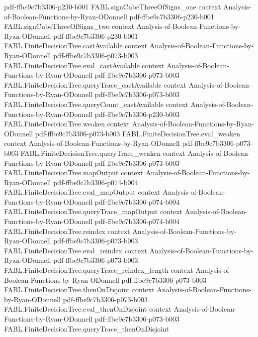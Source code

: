 \begin{theorem}
  {pdf-ffbe9c7b3306-p230-b001}
\proofstep
  {FABL.signCubeThreeOfSigns_one}
  {context}
  {Analysis-of-Boolean-Functions-by-Ryan-ODonnell}
  {pdf-ffbe9c7b3306-p230-b001}
\proofstep
  {FABL.signCubeThreeOfSigns_two}
  {context}
  {Analysis-of-Boolean-Functions-by-Ryan-ODonnell}
  {pdf-ffbe9c7b3306-p230-b001}
\proofstep
  {FABL.FiniteDecisionTree.castAvailable}
  {context}
  {Analysis-of-Boolean-Functions-by-Ryan-ODonnell}
  {pdf-ffbe9c7b3306-p073-b003}
\proofstep
  {FABL.FiniteDecisionTree.eval_castAvailable}
  {context}
  {Analysis-of-Boolean-Functions-by-Ryan-ODonnell}
  {pdf-ffbe9c7b3306-p073-b003}
\proofstep
  {FABL.FiniteDecisionTree.queryTrace_castAvailable}
  {context}
  {Analysis-of-Boolean-Functions-by-Ryan-ODonnell}
  {pdf-ffbe9c7b3306-p073-b003}
\proofstep
  {FABL.FiniteDecisionTree.queryCount_castAvailable}
  {context}
  {Analysis-of-Boolean-Functions-by-Ryan-ODonnell}
  {pdf-ffbe9c7b3306-p230-b003}
\proofstep
  {FABL.FiniteDecisionTree.weaken}
  {context}
  {Analysis-of-Boolean-Functions-by-Ryan-ODonnell}
  {pdf-ffbe9c7b3306-p073-b003}
\proofstep
  {FABL.FiniteDecisionTree.eval_weaken}
  {context}
  {Analysis-of-Boolean-Functions-by-Ryan-ODonnell}
  {pdf-ffbe9c7b3306-p073-b003}
\proofstep
  {FABL.FiniteDecisionTree.queryTrace_weaken}
  {context}
  {Analysis-of-Boolean-Functions-by-Ryan-ODonnell}
  {pdf-ffbe9c7b3306-p073-b003}
\proofstep
  {FABL.FiniteDecisionTree.mapOutput}
  {context}
  {Analysis-of-Boolean-Functions-by-Ryan-ODonnell}
  {pdf-ffbe9c7b3306-p074-b004}
\proofstep
  {FABL.FiniteDecisionTree.eval_mapOutput}
  {context}
  {Analysis-of-Boolean-Functions-by-Ryan-ODonnell}
  {pdf-ffbe9c7b3306-p074-b004}
\proofstep
  {FABL.FiniteDecisionTree.queryTrace_mapOutput}
  {context}
  {Analysis-of-Boolean-Functions-by-Ryan-ODonnell}
  {pdf-ffbe9c7b3306-p074-b004}
\proofstep
  {FABL.FiniteDecisionTree.reindex}
  {context}
  {Analysis-of-Boolean-Functions-by-Ryan-ODonnell}
  {pdf-ffbe9c7b3306-p073-b003}
\proofstep
  {FABL.FiniteDecisionTree.eval_reindex}
  {context}
  {Analysis-of-Boolean-Functions-by-Ryan-ODonnell}
  {pdf-ffbe9c7b3306-p073-b003}
\proofstep
  {FABL.FiniteDecisionTree.queryTrace_reindex_length}
  {context}
  {Analysis-of-Boolean-Functions-by-Ryan-ODonnell}
  {pdf-ffbe9c7b3306-p073-b003}
\proofstep
  {FABL.FiniteDecisionTree.thenOnDisjoint}
  {context}
  {Analysis-of-Boolean-Functions-by-Ryan-ODonnell}
  {pdf-ffbe9c7b3306-p073-b003}
\proofstep
  {FABL.FiniteDecisionTree.eval_thenOnDisjoint}
  {context}
  {Analysis-of-Boolean-Functions-by-Ryan-ODonnell}
  {pdf-ffbe9c7b3306-p073-b003}
\proofstep
  {FABL.FiniteDecisionTree.queryTrace_thenOnDisjoint}

\end{theorem}

